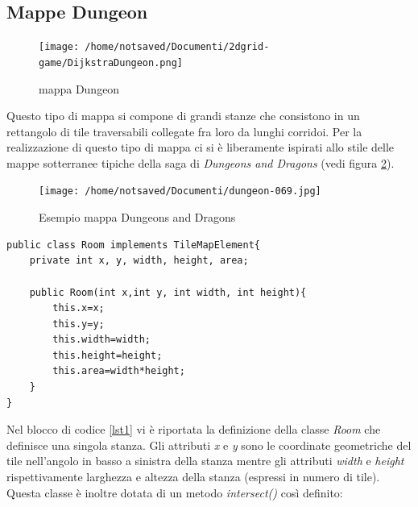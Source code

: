\documentclass[12pt]{book}
\begin{document}
\subsection{Mappe Dungeon}
\begin{figure}[H]
\centering
\texttt{[image: /home/notsaved/Documenti/2dgrid-game/DijkstraDungeon.png]}
\caption{mappa Dungeon}
\label{img1}
\end{figure}
\par{Questo tipo di mappa si compone di grandi stanze che consistono in un rettangolo di tile traversabili collegate fra loro da lunghi corridoi. Per la realizzazione di questo tipo di mappa ci si \`e liberamente ispirati allo stile delle mappe sotterranee tipiche della saga di \emph{Dungeons and Dragons} (vedi figura \ref{img111}).}
\begin{figure}[H]
\centering
\texttt{[image: /home/notsaved/Documenti/dungeon-069.jpg]}
\caption{Esempio mappa Dungeons and Dragons}
\label{img111}
\end{figure}
\iffalse
\par {
\begin{minipage}{\linewidth}
\begin{lstlisting}
public class Room implements TileMapElement{
	private int x, y, width, height, area;

	public Room(int x,int y, int width, int height){
		this.x=x;
		this.y=y;
		this.width=width;
		this.height=height;
		this.area=width*height;
	}
}

\end{lstlisting}
\end{minipage}
}

\par{
Nel blocco di codice \ref{lst1} vi \`e riportata la definizione della classe \emph{Room} che definisce una singola stanza. Gli attributi \emph{x} e \emph{y} sono le coordinate geometriche del tile nell'angolo in basso a sinistra della stanza mentre gli attributi \emph{width} e \emph{height} rispettivamente larghezza e altezza della stanza (espressi in numero di tile). Questa classe \`e inoltre dotata di un metodo \emph{intersect()} cos\`i definito:}
\end{document}
